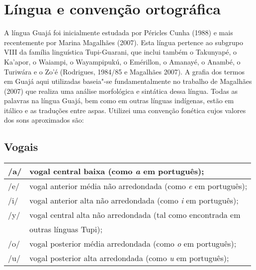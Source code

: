 
\chapter*{Língua e convenção
ortográfica}\label{luxedngua-e-convenuxe7uxe3o-ortogruxe1fica}

\noindent A língua Guajá foi inicialmente estudada por Péricles Cunha (1988) e
mais recentemente por Marina Magalhães (2007). Esta língua pertence ao
subgrupo VIII da família linguística Tupi-Guarani, que inclui também o
Takunyapé, o Ka'apor, o Waiampi, o Wayampipukú, o Emérillon, o Amanayé,
o Anambé, o Turiwára e o Zo'é (Rodrigues, 1984/85 e Magalhães 2007). A
grafia dos termos em Guajá aqui utilizadas baseia"-se fundamentalmente no
trabalho de Magalhães (2007) que realiza uma análise morfológica e
sintática dessa língua. Todas as palavras na língua Guajá, bem como em
outras línguas indígenas, estão em itálico e as traduções entre aspas.
Utilizei uma convenção fonética cujos valores dos sons aproximados são:

\section{Vogais}

\begin{table}[H]
\scriptsize
\centering
\begin{tabular}{|l|l|}
\hline
/a/ & vogal central baixa (como \emph{a} em português);                                       \\ \hline
/e/ & vogal anterior média não arredondada (como \emph{e} em português);                      \\ \hline
/i/ & vogal anterior alta não arredondada (como \emph{i} em português);                       \\ \hline
/y/ & vogal central alta não arredondada (tal como encontrada em \\ & outras línguas Tupi); \\ \hline
/o/ & vogal posterior média arredondada (como \emph{o} em português);                         \\ \hline
/u/ & vogal posterior alta arredondada (como \emph{u} em português);                          \\ \hline
\end{tabular}
\end{table}


